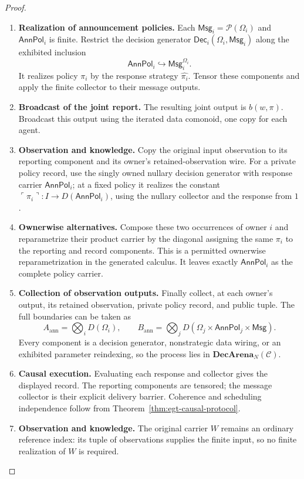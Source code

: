 \documentclass[11pt,a4paper]{article}
\numberwithin{equation}{section}
\theoremstyle{definition}
\theoremstyle{remark}
\theoremstyle{plain}
\begin{document}
\begin{proof}
\leavevmode
\begin{enumerate}[label=\textup{(\arabic*)},leftmargin=*,itemsep=4pt,topsep=3pt]
  \item \textbf{Realization of announcement policies.} Each $\mathsf{Msg}_i=\mathcal P(\Omega_i)$ and $\mathsf{AnnPol}_i$ is finite. Restrict the decision generator
$\mathsf{Dec}_i(\Omega_i,\mathsf{Msg}_i)$ along the exhibited inclusion
\[
 \mathsf{AnnPol}_i\hookrightarrow\mathsf{Msg}_i^{\Omega_i}.
\]
It realizes policy $\pi_i$ by the response strategy $\widehat{\pi_i}$. Tensor these components and apply the finite collector to their message
outputs.
  \item \textbf{Broadcast of the joint report.} The resulting joint output is $b(w,\pi)$. Broadcast this output
using the iterated data comonoid, one copy for each agent.
  \item \textbf{Observation and knowledge.} Copy the original input observation to its reporting component and its
owner's retained-observation wire. For a private policy record, use the
singly owned nullary decision generator with response carrier
$\mathsf{AnnPol}_i$; at a fixed policy it realizes the constant
$\ulcorner\pi_i\urcorner:I\to D(\mathsf{AnnPol}_i)$, using the nullary
collector and the response from $1$.
  \item \textbf{Ownerwise alternatives.} Compose these two occurrences of owner
$i$ and reparametrize their product carrier by the diagonal assigning the
same $\pi_i$ to the reporting and record components. This is a permitted
ownerwise reparametrization in the generated calculus. It leaves exactly
$\mathsf{AnnPol}_i$ as the complete policy carrier.
  \item \textbf{Collection of observation outputs.} Finally collect, at each owner's output, its retained observation, private
policy record, and public tuple. The full boundaries can be taken as
\[
 A_{\mathrm{ann}}=\bigotimes_iD(\Omega_i),\qquad
 B_{\mathrm{ann}}=
   \bigotimes_jD(\Omega_j\times\mathsf{AnnPol}_j\times\mathsf{Msg}).
\]
Every component is a decision generator, nonstrategic data wiring, or an
exhibited parameter reindexing, so the process lies in
$\mathbf{DecArena}_N(\mathcal C)$.
  \item \textbf{Causal execution.} Evaluating each response and collector
gives the displayed record. The reporting components are tensored; the
message collector is their explicit delivery barrier. Coherence and
scheduling independence follow from Theorem~\ref{thm:egt-causal-protocol}.
  \item \textbf{Observation and knowledge.} The original carrier $W$ remains an ordinary reference index: its tuple of
observations supplies the finite input, so no finite realization of $W$ is
required.
\end{enumerate}
\end{proof}
\end{document}
